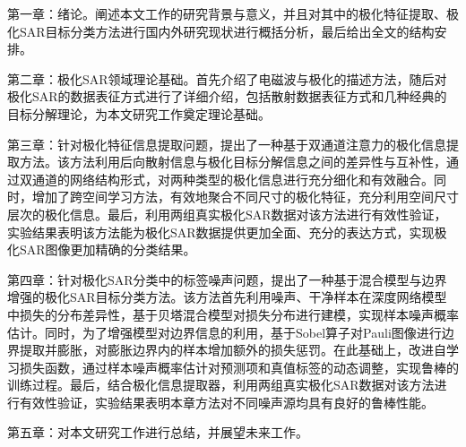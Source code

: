 第一章：绪论。阐述本文工作的研究背景与意义，并且对其中的极化特征提取、极化SAR目标分类方法进行国内外研究现状进行概括分析，最后给出全文的结构安排。

第二章：极化SAR领域理论基础。首先介绍了电磁波与极化的描述方法，随后对极化SAR的数据表征方式进行了详细介绍，包括散射数据表征方式和几种经典的目标分解理论，为本文研究工作奠定理论基础。

第三章：针对极化特征信息提取问题，提出了一种基于双通道注意力的极化信息提取方法。该方法利用后向散射信息与极化目标分解信息之间的差异性与互补性，通过双通道的网络结构形式，对两种类型的极化信息进行充分细化和有效融合。同时，增加了跨空间学习方法，有效地聚合不同尺寸的极化特征，充分利用空间尺寸层次的极化信息。最后，利用两组真实极化SAR数据对该方法进行有效性验证，实验结果表明该方法能为极化SAR数据提供更加全面、充分的表达方式，实现极化SAR图像更加精确的分类结果。

第四章：针对极化SAR分类中的标签噪声问题，提出了一种基于混合模型与边界增强的极化SAR目标分类方法。该方法首先利用噪声、干净样本在深度网络模型中损失的分布差异性，基于贝塔混合模型对损失分布进行建模，实现样本噪声概率估计。同时，为了增强模型对边界信息的利用，基于Sobel算子对Pauli图像进行边界提取并膨胀，对膨胀边界内的样本增加额外的损失惩罚。在此基础上，改进自学习损失函数，通过样本噪声概率估计对预测项和真值标签的动态调整，实现鲁棒的训练过程。最后，结合极化信息提取器，利用两组真实极化SAR数据对该方法进行有效性验证，实验结果表明本章方法对不同噪声源均具有良好的鲁棒性能。

第五章：对本文研究工作进行总结，并展望未来工作。